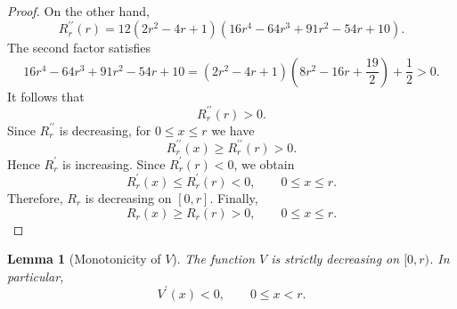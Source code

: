 \documentclass[11pt,a4paper]{article}
\numberwithin{equation}{section}
\numberwithin{table}{section}
\theoremstyle{plain}
\newtheorem{lemma}[theorem]{Lemma}
\theoremstyle{definition}\newtheorem{definition}[theorem]{Definition}
\theoremstyle{remark}\newtheorem{remark}[theorem]{Remark}
\begin{document}
\begin{proof}
On the other hand, 
\begin{equation*}
R_r^{\prime\prime}(r)=12(2r^2-4r+1)(16r^4-64r^3+91r^2-54r+10).
\end{equation*}
The second factor satisfies 
\begin{equation*}
16r^4-64r^3+91r^2-54r+10=(2r^2-4r+1)\left(8r^2-16r+\frac{19}{2}%
\right)+\frac12>0.
\end{equation*}
It follows that 
\begin{equation*}
R_r^{\prime\prime}(r)>0.
\end{equation*}
Since $R_r^{\prime\prime}$ is decreasing, for $0\leq x\leq r$ we have 
\begin{equation*}
R_r^{\prime\prime}(x)\geq R_r^{\prime\prime}(r)>0.
\end{equation*}
Hence $R_r^{\prime}$ is increasing. Since $R_r^{\prime}(r)<0$, we obtain 
\begin{equation*}
R_r^{\prime}(x)\leq R_r^{\prime}(r)<0, \qquad 0\leq x\leq r.
\end{equation*}
Therefore, $R_r$ is decreasing on $[0,r]$. Finally, 
\begin{equation*}
R_r(x)\geq R_r(r)>0, \qquad 0\leq x\leq r.
\end{equation*}
\end{proof}

\begin{lemma}[Monotonicity of $V$]\label{supp:s2lemma4}
The function $V$ is strictly decreasing on $[0,r)$. In particular, 
\begin{equation*}
V^{\prime}(x)<0, \qquad 0\leq x<r.
\end{equation*}
\end{lemma}
\end{document}
